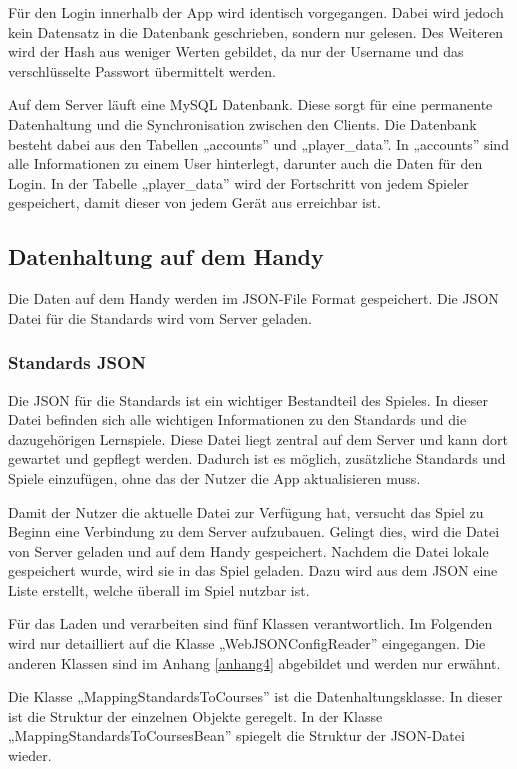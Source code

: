 			Für den Login innerhalb der App wird identisch vorgegangen. Dabei wird jedoch kein Datensatz in die Datenbank geschrieben, sondern nur gelesen. Des Weiteren wird der Hash aus weniger Werten gebildet, da nur der Username und das verschlüsselte Passwort übermittelt werden.
			
			Auf dem Server läuft eine MySQL Datenbank. Diese sorgt für eine permanente Datenhaltung und die Synchronisation zwischen den Clients. Die Datenbank besteht dabei aus den Tabellen „accounts” und „player\_data”. In „accounts” sind alle Informationen zu einem User hinterlegt, darunter auch die Daten für den Login. In der Tabelle „player\_data” wird der Fortschritt von jedem Spieler gespeichert, damit dieser von jedem Gerät aus erreichbar ist.

		\subsection{Datenhaltung auf dem Handy}
		
			Die Daten auf dem Handy werden im \ac{JSON}-File Format gespeichert. Die \ac{JSON} Datei für die Standards wird vom Server geladen.

			\subsubsection{Standards \ac{JSON}}
				Die \ac{JSON} für die Standards ist ein wichtiger Bestandteil des Spieles. In dieser Datei befinden sich alle wichtigen Informationen zu den Standards und die dazugehörigen Lernspiele. Diese Datei liegt zentral auf dem Server und kann dort gewartet und gepflegt werden. Dadurch ist es möglich, zusätzliche Standards und Spiele einzufügen, ohne das der Nutzer die App aktualisieren muss.

				Damit der Nutzer die aktuelle Datei zur Verfügung hat, versucht das Spiel zu Beginn eine Verbindung zu dem Server aufzubauen. Gelingt dies, wird die Datei von Server geladen und auf dem Handy gespeichert. Nachdem die Datei lokale gespeichert wurde, wird sie in das Spiel geladen. Dazu wird aus dem \ac{JSON} eine Liste erstellt, welche überall im Spiel nutzbar ist.

				Für das Laden und verarbeiten sind fünf Klassen verantwortlich. Im Folgenden wird nur detailliert auf die Klasse „WebJSONConfigReader” eingegangen. Die anderen Klassen sind im Anhang \ref{anhang4} abgebildet und werden nur erwähnt.

				Die Klasse „MappingStandardsToCourses” ist die Datenhaltungsklasse. In dieser ist die Struktur der einzelnen Objekte geregelt. In der Klasse „MappingStandardsToCoursesBean” spiegelt die Struktur der \ac{JSON}-Datei wieder. 

